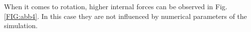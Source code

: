 \documentclass[a4paper,twoside, openright,12pt]{report}
\begin{document}


When it comes to rotation, higher internal forces can be observed in Fig. \ref{FIG:abb4}. In this case they are not influenced by numerical parameters of the simulation.
\end{document}
